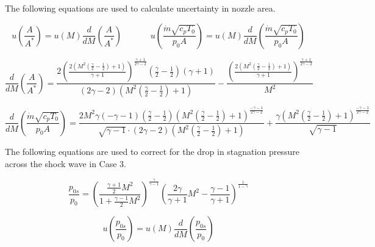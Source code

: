 \documentclass{article}
\begin{document}
The following equations are used to calculate uncertainty in nozzle area.

\begin{equation}
    u\left( \frac{A}{A^*} \right) = u(M) \frac{d}{dM}\left( \frac{A}{A^*} \right) \;\;\;\;\;\;\;\;\;\;\;\; u\left( \frac{\dot{m}\sqrt{c_pT_0}}{p_0A} \right) = u(M) \frac{d}{dM}\left( \frac{\dot{m}\sqrt{c_pT_0}}{p_0A} \right)
\end{equation}

\begin{equation}
    \frac{d}{dM}\left( \frac{A}{A^*} \right) = \frac{2 \left(\frac{2 \left(M^{2} \left(\frac{\gamma}{2} - \frac{1}{2}\right) + 1\right)}{\gamma + 1}\right)^{\frac{\gamma + 1}{2 \gamma - 2}} \left(\frac{\gamma}{2} - \frac{1}{2}\right) \left(\gamma + 1\right)}{\left(2 \gamma - 2\right) \left(M^{2} \left(\frac{\gamma}{2} - \frac{1}{2}\right) + 1\right)} - \frac{\left(\frac{2 \left(M^{2} \left(\frac{\gamma}{2} - \frac{1}{2}\right) + 1\right)}{\gamma + 1}\right)^{\frac{\gamma + 1}{2 \gamma - 2}}}{M^{2}}
    \label{eqn:dA_dM}
\end{equation}

\begin{equation}
    \frac{d}{dM}\left( \frac{\dot{m}\sqrt{c_pT_0}}{p_0A} \right) = \frac{2 M^{2} \gamma \left(- \gamma - 1\right) \left(\frac{\gamma}{2} - \frac{1}{2}\right) \left(M^{2} \left(\frac{\gamma}{2} - \frac{1}{2}\right) + 1\right)^{\frac{- \gamma - 1}{2 \gamma - 2}}}{\sqrt{\gamma - 1} \cdot \left(2 \gamma - 2\right) \left(M^{2} \left(\frac{\gamma}{2} - \frac{1}{2}\right) + 1\right)} + \frac{\gamma \left(M^{2} \left(\frac{\gamma}{2} - \frac{1}{2}\right) + 1\right)^{\frac{- \gamma - 1}{2 \gamma - 2}}}{\sqrt{\gamma - 1}}
    \label{eqn:dmdot_dM}
\end{equation}

The following equations are used to correct for the drop in stagnation pressure across the shock wave in Case 3.

\begin{equation}
    \frac{p_{0s}}{p_0} = \left( \frac{\frac{\gamma+1}{2}M^2}{1 + \frac{\gamma-1}{2}M^2}\right) ^ \frac{\gamma}{\gamma-1} \left( \frac{2\gamma}{\gamma+1} M^2 - \frac{\gamma-1}{\gamma+1}\right) ^ \frac{1}{1 - \gamma}
\end{equation}

\begin{equation}
    u\left( \frac{p_{0s}}{p_0} \right) = u(M) \frac{d}{dM}\left( \frac{p_{0s}}{p_0} \right)
\end{equation}
\end{document}
